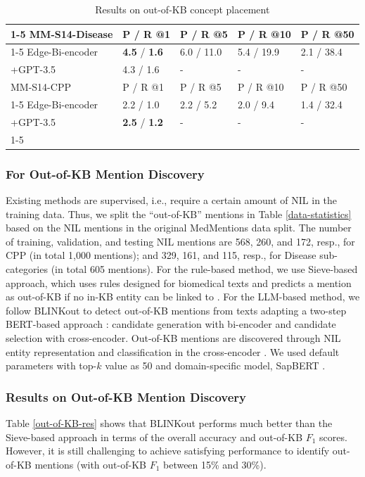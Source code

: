 \documentclass[sigconf]{acmart}
\begin{document}
\begin{table}
\small
\caption{Results on out-of-KB concept placement}\label{insertion-res}
\begin{tabular}{l|l|l|l|l}
\cline{1-5}
MM-S14-Disease  & P / R @1 & P / R @5 & P / R @10 & P / R @50\\
\cline{1-5}
Edge-Bi-encoder &  \textbf{4.5} / \textbf{1.6}         & 6.0 / 11.0         & 5.4 / 19.9 & 2.1 / 38.4  \\
+GPT-3.5    & 4.3 / 1.6          &    -       &   -      &  -  \\
\hline\hline
MM-S14-CPP      & P / R @1 & P / R @5 & P / R @10 & P / R @50 \\
\cline{1-5}
Edge-Bi-encoder &  2.2 / 1.0 & 2.2 / 5.2 & 2.0 / 9.4 & 1.4 / 32.4\\ 
+GPT-3.5        & \textbf{2.5} / \textbf{1.2}          &   -        &   -   &   -   \\ 
\cline{1-5}
\end{tabular}
\end{table}

\subsubsection*{For Out-of-KB Mention Discovery} Existing methods are supervised, i.e., require a certain amount of NIL in the training data. Thus, we split the ``out-of-KB'' mentions in Table \ref{data-statistics} based on the NIL mentions in the original MedMentions data split. The number of training, validation, and testing NIL mentions are 568, 260, and 172, resp., for CPP (in total 1,000 mentions); and 329, 161, and 115, resp., for Disease sub-categories  (in total 605 mentions). For the rule-based method, we use Sieve-based approach, which uses rules designed for biomedical texts and predicts a mention as out-of-KB if no in-KB entity can be linked to \cite{dsouza-ng-2015-sieve-based}. For the LLM-based method, we follow BLINKout \cite{dong2023NIL} to detect out-of-KB mentions from texts adapting a two-step BERT-based approach \cite{wu2020blink}: candidate generation with bi-encoder and candidate selection with cross-encoder. Out-of-KB mentions are discovered through NIL entity representation and classification in the cross-encoder \cite{dong2023NIL}. We used default parameters with top-$k$ value as 50 and domain-specific model, SapBERT \cite{liu2021sap}.

\subsubsection*{Results on Out-of-KB Mention Discovery} Table \ref{out-of-KB-res} shows that BLINKout performs much better than the Sieve-based approach in terms of the overall accuracy and out-of-KB $F_1$ scores. However, it is still challenging to achieve satisfying performance to identify out-of-KB mentions (with out-of-KB $F_{1}$ between 15\% and 30\%).
\end{document}
